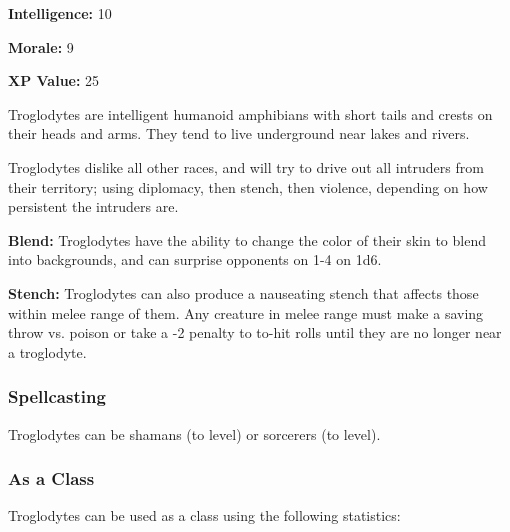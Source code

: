 \begin{multicols*}{2}
{\textbf{Intelligence:} 10

\textbf{Morale:} 9

\textbf{XP Value:} 25}

Troglodytes are intelligent humanoid amphibians with short tails and crests on their heads and arms. They tend to live underground near lakes and rivers.

Troglodytes dislike all other races, and will try to drive out all intruders from their territory; using diplomacy, then stench, then violence, depending on how persistent the intruders are.

\textbf{Blend:} Troglodytes have the ability to change the color of their skin to blend into backgrounds, and can surprise opponents on 1-4 on 1d6.

\textbf{Stench:} Troglodytes can also produce a nauseating stench that affects those within melee range of them. Any creature in melee range must make a saving throw vs. poison or take a -2 penalty to to-hit rolls until they are no longer near a troglodyte.

\subsubsection{Spellcasting}
Troglodytes can be shamans (to  level) or sorcerers (to  level).

\subsubsection{As a Class}
Troglodytes can be used as a class using the following statistics:



\end{multicols*}
